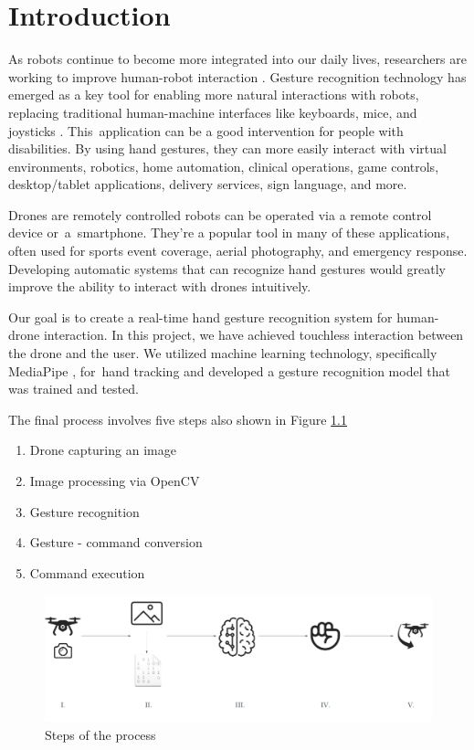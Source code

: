 \clearpage
\chapter{Introduction}
\label{ch:intro}

As robots continue to become more integrated into our daily lives, researchers are working to improve human-robot interaction \cite{premaratne2014human}. Gesture recognition technology has emerged as a key tool for enabling more natural interactions with robots, replacing traditional human-machine interfaces like keyboards, mice, and joysticks \cite{smith2022hand}. This~application can be a good intervention for people with disabilities. By using hand gestures, they can more easily interact with virtual environments, robotics, home automation, clinical operations, game controls, desktop/tablet applications, delivery services, sign language, and more. 


Drones are remotely controlled robots can be operated via a remote control device or~a~smartphone. They're a popular tool in many of these applications, often used for sports event coverage, aerial photography, and emergency response. Developing automatic systems that can recognize hand gestures would greatly improve the ability to interact with drones intuitively.

 Our goal is to create a real-time hand gesture recognition system for human-drone interaction. In this project, we have achieved touchless interaction between the drone and the user. We utilized machine learning technology, specifically MediaPipe \cite{mediapipe2023source}, for~hand tracking and developed a gesture recognition model that was trained and tested. 
 
 The final process involves five steps also shown in Figure \ref{fig:conclusion} 

\begin{enumerate}[label=\Roman*.]
	\item Drone capturing an image
	\item Image processing via OpenCV
	\item Gesture recognition
	\item Gesture - command conversion
	\item Command execution
\end{enumerate}


\begin{figure}[h!]
	\centering
	\includegraphics[width =\textwidth]{images/conclusion.pdf}
	\caption{Steps of the process}
	\label{fig:conclusion}
\end{figure}


